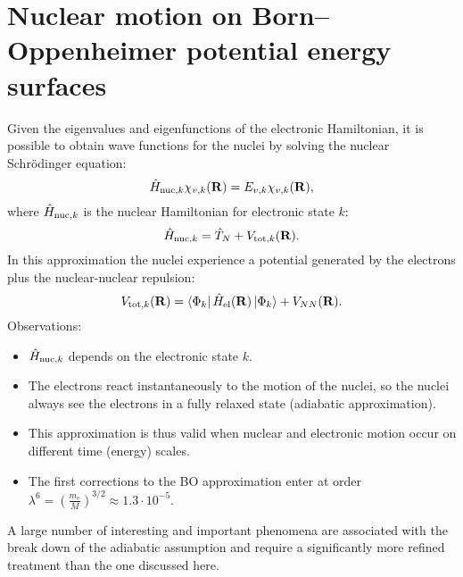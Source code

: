 \documentclass[../Main/chem532-notes.tex]{subfiles}
\begin{document}
\section{Nuclear motion on Born--Oppenheimer potential energy surfaces}
Given the eigenvalues and eigenfunctions of the electronic Hamiltonian, it is possible to obtain wave functions for the nuclei by solving the nuclear Schr\"{o}dinger equation:
\begin{equation}
\hat{H}_{{\rm nuc},k} \chi_{v,k}(\mathbf{R}) =  E_{v,k} \chi_{v,k}(\mathbf{R}),
\end{equation}
where $\hat{H}_{{\rm nuc},k}$ is the nuclear Hamiltonian for electronic state $k$:
\begin{equation}
\hat{H}_{{\rm nuc},k} = \hat{T}_{N} + V_{{\rm tot},k}(\mathbf{R}).
\end{equation}
In this approximation the nuclei experience a potential generated by the electrons plus the nuclear-nuclear repulsion:
\begin{equation}
V_{{\rm tot},k}(\mathbf{R}) = \bra{\Phi_k}\hat{H}_{\rm el}(\mathbf{R}) \ket{\Phi_k} + V_{NN}(\mathbf{R}).
\end{equation}
Observations:
\begin{itemize}
\item $\hat{H}_{{\rm nuc},k}$ depends on the electronic state $k$.
\item The electrons react instantaneously to the motion of the nuclei, so the nuclei always see the electrons in a fully relaxed state (adiabatic approximation).
\item This approximation is thus valid when nuclear and electronic motion occur on different time (energy) scales.
\item The first corrections to the BO approximation enter at order $\lambda^6 = \left( \frac{m_e}{M} \right)^{3/2} \approx 1.3 \cdot 10^{-5}$.
\end{itemize}


A large number of interesting and important phenomena are associated with the break down of the adiabatic assumption and require a significantly more refined treatment than the one discussed here.
\end{document}
